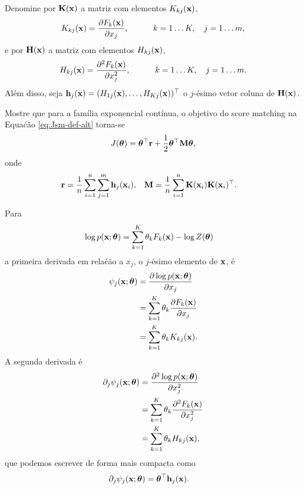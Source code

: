 \begin{exenumerate}
    
    \item Denomine por $\mathbf{K}(\mathbf{x})$ a matriz com elementos $K_{kj}(\mathbf{x})$,
    \begin{equation}
        K_{kj}(\mathbf{x}) = \frac{\partial F_k(\mathbf{x})}{\partial x_j}, \quad \quad \quad k=1 \ldots K, \quad j=1 \ldots m,
    \end{equation}
    e por $\mathbf{H}(\mathbf{x})$ a matriz com elementos $H_{kj}(\mathbf{x})$,
    \begin{equation}
        H_{kj}(\mathbf{x}) = \frac{\partial^2 F_k(\mathbf{x})}{\partial x_j^2}, \quad \quad \quad k=1 \ldots K, \quad j=1 \ldots m.
    \end{equation}
    Al\'em disso, seja $\mathbf{h}_j(\mathbf{x}) = (H_{1j}(\mathbf{x}), \ldots, H_{Kj}(\mathbf{x}))^\top$ o $j$-\'esimo vetor coluna de $\mathbf{H}(\mathbf{x})$.
    
    Mostre que para a fam\'ilia exponencial cont\'inua, o objetivo do score matching na Equa\'c\~ao \eqref{eq:Jsm-def-alt} torna-se
    \begin{equation}
        J(\boldsymbol{\theta}) =  \boldsymbol{\theta}^\top \mathbf{r} +  \frac{1}{2} \boldsymbol{\theta}^\top \mathbf{M} \boldsymbol{\theta},
    \end{equation}
    onde
    \begin{align}
        \label{eq:Jsm-sol-alt}
        \mathbf{r}&=\frac{1}{n}\sum_{i=1}^n \sum_{j=1}^m \mathbf{h}_j(\mathbf{x}_i), & \mathbf{M} &= \frac{1}{n}\sum_{i=1}^n \mathbf{K}(\mathbf{x}_i)\mathbf{K}(\mathbf{x}_i)^\top.
    \end{align}
    
    \begin{solution}
        Para
        \begin{align}
            \log p(\mathbf{x};\boldsymbol{\theta}) &= \sum_{k=1}^K \theta_k F_k(\mathbf{x}) -\log Z(\boldsymbol{\theta})
        \end{align}
        a primeira derivada em rela\'c\~ao a $x_j$, o $j$-\'esimo elemento de $\mathbf{x}$, \'e
        \begin{align}
            \psi_j(\mathbf{x}; \boldsymbol{\theta}) &= \frac{\partial \log p(\mathbf{x}; \boldsymbol{\theta})}{\partial x_j}\\
            & = \sum_{k=1}^K \theta_k \frac{\partial F_k(\mathbf{x})}{\partial x_j}\\
            & =  \sum_{k=1}^K \theta_k K_{kj}(\mathbf{x}).
        \end{align}
        A segunda derivada \'e
        \begin{align}
            \partial_j \psi_j(\mathbf{x}; \boldsymbol{\theta}) & = \frac{\partial^2 \log p(\mathbf{x}; \boldsymbol{\theta})}{\partial x_j^2}\\
            & =  \sum_{k=1}^K \theta_k \frac{\partial^2 F_k(\mathbf{x})}{\partial x_j^2}\\
            & =  \sum_{k=1}^K \theta_k  H_{kj}(\mathbf{x}),
        \end{align}
        que podemos escrever de forma mais compacta como
        \begin{align}
            \partial_j  \psi_j(\mathbf{x}; \boldsymbol{\theta}) &= \boldsymbol{\theta}^\top \mathbf{h}_j(\mathbf{x}).
        \end{align}
        

\end{solution}
\end{exenumerate}
